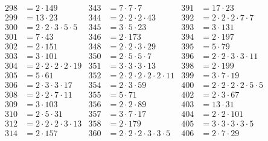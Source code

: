 \begin{align*}
  298&=2\cdot149                             & 343&=7\cdot7\cdot7                               & 391&=17\cdot23                             \\
  299&=13\cdot23                             & 344&=2\cdot2\cdot2\cdot43                        & 392&=2\cdot2\cdot2\cdot7\cdot7             \\
  300&=2\cdot2\cdot3\cdot5\cdot5             & 345&=3\cdot5\cdot23                              & 393&=3\cdot131                             \\
  301&=7\cdot43                              & 346&=2\cdot173                                   & 394&=2\cdot197                             \\
  302&=2\cdot151                             & 348&=2\cdot2\cdot3\cdot29                        & 395&=5\cdot79                              \\
  303&=3\cdot101                             & 350&=2\cdot5\cdot5\cdot7                         & 396&=2\cdot2\cdot3\cdot3\cdot11            \\
  304&=2\cdot2\cdot2\cdot2\cdot19            & 351&=3\cdot3\cdot3\cdot13                        & 398&=2\cdot199                             \\
  305&=5\cdot61                              & 352&=2\cdot2\cdot2\cdot2\cdot2\cdot11            & 399&=3\cdot7\cdot19                        \\
  306&=2\cdot3\cdot3\cdot17                  & 354&=2\cdot3\cdot59                              & 400&=2\cdot2\cdot2\cdot2\cdot5\cdot5       \\
  308&=2\cdot2\cdot7\cdot11                  & 355&=5\cdot71                                    & 402&=2\cdot3\cdot67                        \\
  309&=3\cdot103                             & 356&=2\cdot2\cdot89                              & 403&=13\cdot31                             \\
  310&=2\cdot5\cdot31                        & 357&=3\cdot7\cdot17                              & 404&=2\cdot2\cdot101                       \\
  312&=2\cdot2\cdot2\cdot3\cdot13            & 358&=2\cdot179                                   & 405&=3\cdot3\cdot3\cdot3\cdot5             \\
  314&=2\cdot157                             & 360&=2\cdot2\cdot2\cdot3\cdot3\cdot5             & 406&=2\cdot7\cdot29                        \\

\end{align*}
